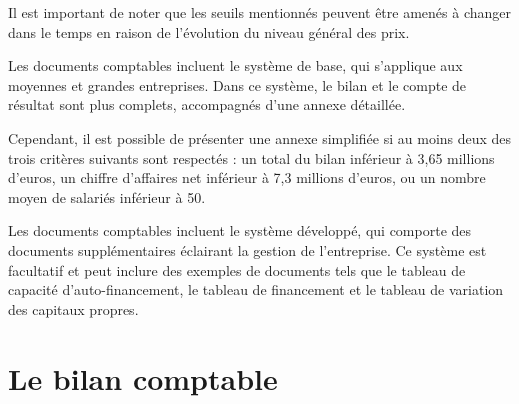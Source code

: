 \documentclass[a4paper, 12pt]{report}
\begin{document}
Il est important de noter que les seuils mentionnés peuvent être amenés à changer dans le temps en raison de l'évolution du niveau général des prix.

Les documents comptables incluent le système de base, qui s'applique aux moyennes et grandes entreprises. Dans ce système, le bilan et le compte de résultat sont plus complets, accompagnés d'une annexe détaillée.

Cependant, il est possible de présenter une annexe simplifiée si au moins deux des trois critères suivants sont respectés : un total du bilan inférieur à 3,65 millions d'euros, un chiffre d'affaires net inférieur à 7,3 millions d'euros, ou un nombre moyen de salariés inférieur à 50.

Les documents comptables incluent le système développé, qui comporte des documents supplémentaires éclairant la gestion de l'entreprise. Ce système est facultatif et peut inclure des exemples de documents tels que le tableau de capacité d'auto-financement, le tableau de financement et le tableau de variation des capitaux propres.

\chapter{Le bilan comptable}
\end{document}
